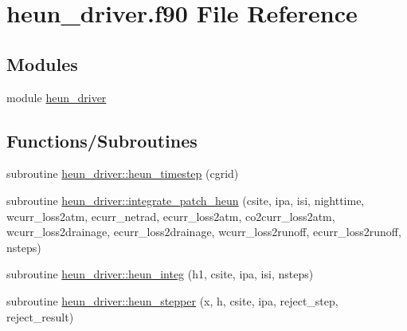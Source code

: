 \hypertarget{heun__driver_8f90}{}\section{heun\+\_\+driver.\+f90 File Reference}
\label{heun__driver_8f90}
\subsection*{Modules}
\begin{DoxyCompactItemize}
\item 
module \hyperlink{namespaceheun__driver}{heun\+\_\+driver}
\end{DoxyCompactItemize}
\subsection*{Functions/\+Subroutines}
\begin{DoxyCompactItemize}
\item 
subroutine \hyperlink{namespaceheun__driver_afef0343ba81822423a4a5ebfa053686a}{heun\+\_\+driver\+::heun\+\_\+timestep} (cgrid)
\item 
subroutine \hyperlink{namespaceheun__driver_a5a10a1f76045acf99d8d30a8ae7b3257}{heun\+\_\+driver\+::integrate\+\_\+patch\+\_\+heun} (csite, ipa, isi, nighttime, wcurr\+\_\+loss2atm, ecurr\+\_\+netrad, ecurr\+\_\+loss2atm, co2curr\+\_\+loss2atm, wcurr\+\_\+loss2drainage, ecurr\+\_\+loss2drainage, wcurr\+\_\+loss2runoff, ecurr\+\_\+loss2runoff, nsteps)
\item 
subroutine \hyperlink{namespaceheun__driver_a20432ede6f46072e62ed54efd0577d75}{heun\+\_\+driver\+::heun\+\_\+integ} (h1, csite, ipa, isi, nsteps)
\item 
subroutine \hyperlink{namespaceheun__driver_a544f03d6f5fea4a41376ea486944a9a3}{heun\+\_\+driver\+::heun\+\_\+stepper} (x, h, csite, ipa, reject\+\_\+step, reject\+\_\+result)
\end{DoxyCompactItemize}
